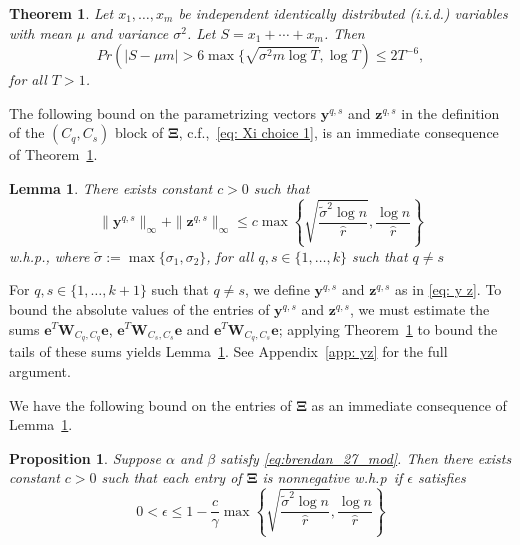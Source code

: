 \documentclass[twoside,11pt]{article}
\newtheorem{theorem}{Theorem}[section]
\newtheorem{proposition}{Proposition}[section]
\newtheorem{lemma}{Lemma}[section]
\newcommand{\e}{\bs {e}}
\newcommand{\bs}{\boldsymbol}
\newcommand{\y}{\bs {y}}
\newcommand{\W}{\bs {W}}
\newcommand{\z}{\bs{z}}
\newcommand{\0}{\bs{0}}
\newcommand{\bra}[1]{\ensuremath{\left\{ #1 \right\}}} %
\newcommand{\iid}{independent identically distributed (i.i.d.) }
\begin{document}
{\begin{theorem}
	\label{thm: Hoeffding}
	Let $x_1, \dots, x_m$ be \iid variables with mean $\mu$
	and variance $\sigma^2$.
	Let $S = x_1 + \cdots + x_m$. Then
	\begin{equation}
	\label{eq:hoeffding}
	Pr( |S - \mu m| > 6 \max \{\sqrt{\sigma^2 m \log T}, \log T )
	 \le 2 T^{-6},
	\end{equation}
	for all $T > 1$.
\end{theorem}

The following bound
on the parametrizing vectors \(\y^{q,s}\) and \(\z^{q,s}\) in the definition of the \((C_q, C_s)\) block of \(\bs\Xi\), c.f.,~\eqref{eq: Xi choice 1},
is an immediate consequence of Theorem~\ref{thm: Hoeffding}.

\begin{lemma}
	\label{lem: yz bound}
	There exists constant $c > 0$ such that
	\begin{equation} \label{eq: yz bound}
		\|\bs{y}^{q,s}\|_{\infty} +  \|\bs{z}^{q,s}\|_{\infty} \leq 
		c \max \bra{ \sqrt{ \frac{\tilde \sigma^2 \log n}{\hat r}} ,
			\frac{\log n}{\hat r} }
	\end{equation}
	w.h.p.,
	where $\tilde \sigma := \max \{ \sigma_1, \sigma_2 \}$,
	for all \(q,s \in \{1,\dots,k\}\) such that 	$q \neq s$ 
\end{lemma}

For \(q,s \in \{1,\dots, k+1\}\) such that \(q \neq s\), we define \(\y^{q,s}\) and \(\z^{q,s}\) as in \eqref{eq: y z}. To bound
the absolute values of the entries of \(\y^{q,s}\) and \(\z^{q,s}\), we must estimate the sums \(\e^T \W_{C_q, C_q} \e\),
\(\e^T \W_{C_s, C_s} \e \) and \(\e^T \W_{C_q, C_s} \e \); applying Theorem~\ref{thm: Hoeffding} to bound the tails 
of these sums yields Lemma~\ref{lem: yz bound}. See Appendix~\ref{app: yz} for the full argument.

We have the following bound on the entries of \(\bs \Xi\) as an immediate consequence of  Lemma~\ref{lem: yz bound}.

\begin{proposition}
	\label{thm: Xi bound}
	Suppose $\alpha$ and $\beta$ satisfy \eqref{eq:brendan_27_mod}. 
	Then there exists constant $c>0$ such that each entry of $\bs{\Xi}$ is nonnegative w.h.p~if \(\epsilon\) 	satisfies
	\begin{equation} \label{eq: xi eps}
	0 < \epsilon \leq 
		1 - \frac{c}{\gamma}\max \bra{ \sqrt{ \frac{\tilde \sigma^2 \log n}{\hat r}} ,
			\frac{\log n}{\hat r}  }
	\end{equation}
\end{proposition}

}
\end{document}

